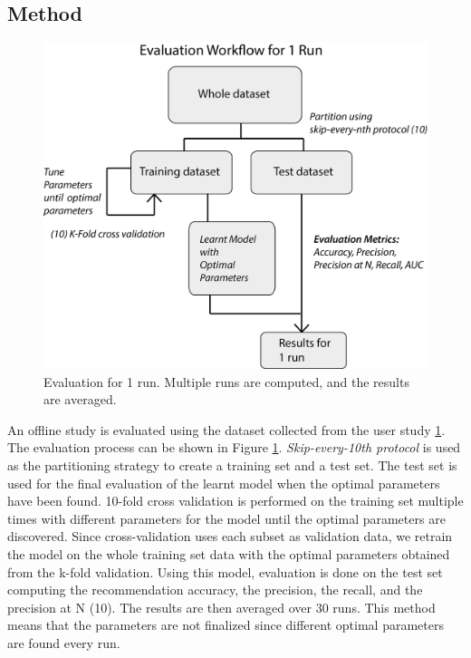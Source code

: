 \subsection{Method} \label{method}

\begin{figure}
\centering
\includegraphics[scale=0.7]{recent_images/evaluation_workflow.png}
\caption{Evaluation for 1 run. Multiple runs are computed, and the results are averaged.}
\label{fig:evaluation_workflow}
\end{figure}

An offline study is evaluated using the dataset collected from the user study \ref{fig:evaluation_workflow}. The evaluation process can be shown in Figure \ref{fig:evaluation_workflow}. \textit{Skip-every-10th protocol} is used as the partitioning strategy to create a training set and a test set. The test set is used for the final evaluation of the learnt model when the optimal parameters have been found. 10-fold cross validation is performed on the training set multiple times with different parameters for the model until the optimal parameters are discovered. Since cross-validation uses each subset as validation data, we retrain the model on the whole training set data with the optimal parameters obtained from the k-fold validation. Using this model, evaluation is done on the test set computing the recommendation accuracy, the precision, the recall, and the precision at N (10). The results are then averaged over 30 runs. This method means that the parameters are not finalized since different optimal parameters are found every run. 

